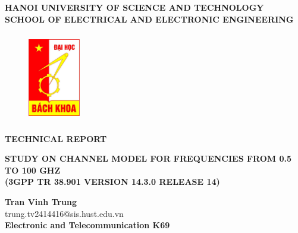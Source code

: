 \begin{titlepage}
\begin{center}
\textbf{\fontsize{13pt}{0pt}\selectfont HANOI UNIVERSITY OF SCIENCE AND TECHNOLOGY} \\
\textbf{\fontsize{14pt}{0pt}\selectfont SCHOOL OF ELECTRICAL AND ELECTRONIC ENGINEERING}
\vspace{0.5cm}
 \begin{figure}[H]
     \centering
     \includegraphics[width=2.28cm,height=3.94cm]{Images/logodhbk.png}
 \end{figure}
\vspace{10pt}
\textbf{\fontsize{21pt}{0pt}\selectfont TECHNICAL REPORT}
\end{center}
\begin{center}
    \textbf{\fontsize{17pt}{0pt}\selectfont STUDY ON CHANNEL MODEL FOR FREQUENCIES FROM 0.5 TO 100 GHZ \\
    \vspace{0.4cm}
    \textbf{\fontsize{17pt}{0pt}\selectfont (3GPP TR 38.901 VERSION 14.3.0 RELEASE 14)}\\}

    \textbf{\fontsize{11pt}{0pt}\selectfont Tran Vinh Trung}\\
    \fontsize{14pt}{0pt}\selectfont trung.tv2414416@sis.hust.edu.vn\\
    \vspace{0.5cm}
    \textbf{\fontsize{14pt}{0pt}\selectfont Electronic and Telecommunication K69}\\
\vspace{2.5cm}


\end{center}
\end{titlepage}
